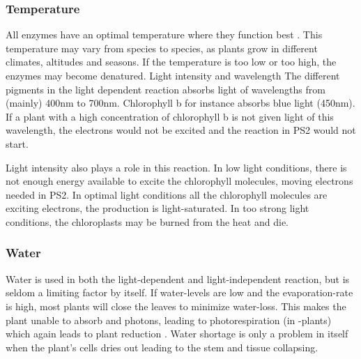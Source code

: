 \subsubsection{Temperature}
All enzymes have an optimal temperature where they function best \citep{bios}. This temperature may vary from species to species, as plants grow in different climates, altitudes and seasons. If the temperature is too low or too high, the enzymes may become denatured.  
Light intensity and wavelength
The different pigments in the light dependent reaction absorbs light of wavelengths from (mainly) 400nm to 700nm. Chlorophyll b for instance absorbs blue light (450nm). If a plant with a high concentration of chlorophyll b is not given light of this wavelength, the electrons would not be excited and the reaction in PS2 would not start. 

Light intensity also plays a role in this reaction. In low light conditions, there is not enough energy available to excite the chlorophyll molecules, moving electrons needed in PS2. In optimal light conditions all the chlorophyll molecules are exciting electrons, the production is light-saturated. In too strong light conditions, the chloroplasts may be burned from the heat and die.  

\subsubsection{Water}
Water is used in both the light-dependent and light-independent reaction, but is seldom a limiting factor by itself. If water-levels are low and the evaporation-rate is high, most plants will close the leaves to minimize water-loss. This makes the plant unable to absorb  and photons, leading to photorespiration (in -plants) which again leads to plant reduction \citep{bi2}. Water shortage is only a problem in itself when the plant’s cells dries out leading to the stem and tissue collapsing. 
